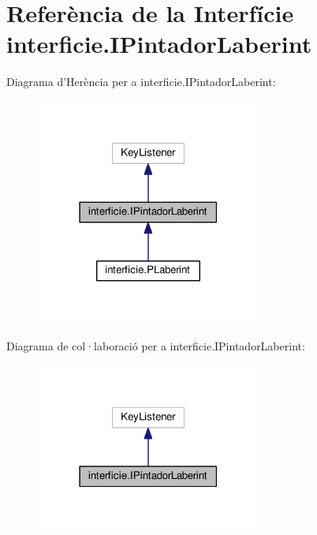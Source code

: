 \hypertarget{interfaceinterficie_1_1_i_pintador_laberint}{\section{Referència de la Interfície interficie.\+I\+Pintador\+Laberint}
\label{interfaceinterficie_1_1_i_pintador_laberint}
}


Diagrama d'Herència per a interficie.\+I\+Pintador\+Laberint\+:\nopagebreak
\begin{figure}[H]
\begin{center}
\leavevmode
\includegraphics[width=210pt]{interfaceinterficie_1_1_i_pintador_laberint__inherit__graph}
\end{center}
\end{figure}


Diagrama de col·laboració per a interficie.\+I\+Pintador\+Laberint\+:\nopagebreak
\begin{figure}[H]
\begin{center}
\leavevmode
\includegraphics[width=210pt]{interfaceinterficie_1_1_i_pintador_laberint__coll__graph}
\end{center}
\end{figure}
